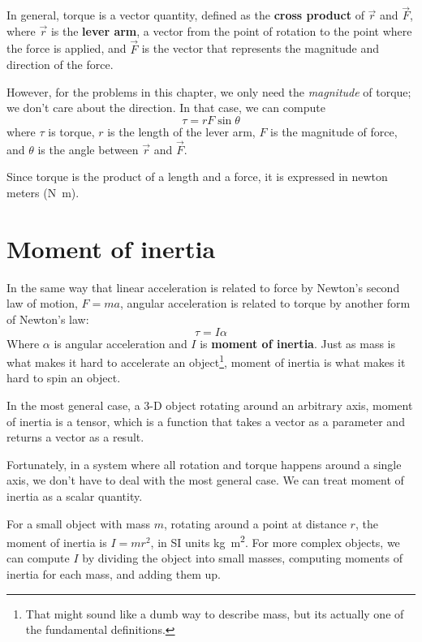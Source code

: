 \documentclass[12pt]{book}
\theoremstyle{exercise}
\begin{document}
In general, torque is a vector quantity, defined as the {\bf cross product} of $\vec{r}$ and $\vec{F}$, where $\vec{r}$ is the {\bf lever arm}, a vector from the point of rotation to the point where the force is applied, and $\vec{F}$ is the vector that represents the magnitude and direction of the force.


However, for the problems in this chapter, we only need the {\em magnitude} of torque; we don't care about the direction.  In that case, we can compute
%
\[ \tau = r F \sin \theta \]
%
where $\tau$ is torque, $r$ is the length of the lever arm, $F$ is the magnitude of force, and $\theta$ is the angle between $\vec{r}$ and $\vec{F}$.  


Since torque is the product of a length and a force, it is expressed in newton meters (\si{\newton\meter}).


\section{Moment of inertia}

In the same way that linear acceleration is related to force by Newton's second law of motion, $F=ma$, angular acceleration is related to torque by another form of Newton's law:
%
\[ \tau = I \alpha \]
%
Where $\alpha$ is angular acceleration and $I$ is {\bf moment of inertia}.  Just as mass is what makes it hard to accelerate an object\footnote{That might sound like a dumb way to describe mass, but its actually one of the fundamental definitions.}, moment of inertia is what makes it hard to spin an object.


In the most general case, a 3-D object rotating around an arbitrary axis, moment of inertia is a tensor, which is a function that takes a vector as a parameter and returns a vector as a result.


Fortunately, in a system where all rotation and torque happens around a single axis, we don't have to deal with the most general case.  We can treat moment of inertia as a scalar quantity.


For a small object with mass $m$, rotating around a point at distance $r$, the moment of inertia is $I = m r^2$, in SI units \si{\kilogram\meter\squared}.  For more complex objects, we can compute $I$ by dividing the object into small masses, computing moments of inertia for each mass, and adding them up.
\end{document}
